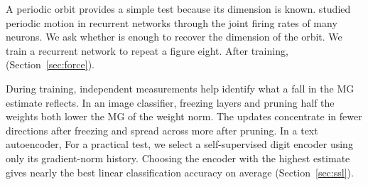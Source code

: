 {A periodic orbit provides a simple test because its dimension is known. \citet{sussillo2009generating} studied periodic motion in recurrent networks through the joint firing rates of many neurons. We ask whether  is enough to recover the dimension of the orbit. We train a recurrent network to repeat a figure eight. After training,  (Section~\ref{sec:force}).

During training, independent measurements help identify what a fall in the MG estimate reflects. In an image classifier, freezing layers and pruning half the weights both lower the MG of the weight norm. The updates concentrate in fewer directions after freezing and spread across more after pruning. In a text autoencoder,  For a practical test, we select a self-supervised digit encoder using only its gradient-norm history. Choosing the encoder with the highest estimate gives nearly the best linear classification accuracy on average (Section~\ref{sec:ssl}).
}
